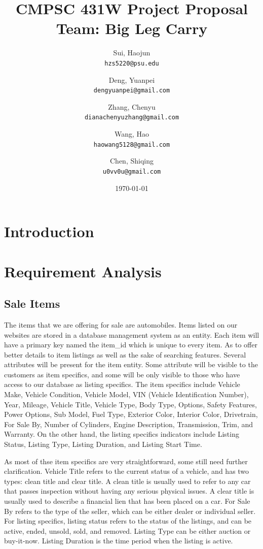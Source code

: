 \documentclass[12pt]{article}
\title{CMPSC 431W Project Proposal\\Team: Big Leg Carry}
\author{
	Sui, Haojun\\
	\texttt{hzs5220@psu.edu}
	\and
	Deng, Yuanpei\\
	\texttt{dengyuanpei@gmail.com}
	\and
	Zhang, Chenyu\\
	\texttt{dianachenyuzhang@gmail.com}
	\and
	Wang, Hao\\
	\texttt{haowang5128@gmail.com}
	\and
	Chen, Shiqing\\
	\texttt{u0vv0u@gmail.com}
}
\date{\today}
\begin{document}
\maketitle
\thispagestyle{empty}
\newpage
\tableofcontents
\setcounter{page}{1}
\newpage
\listoffigures
\newpage
\listoftables
\newpage


\section{Introduction}
\newpage

\section{Requirement Analysis}
\subsection{Sale Items}
The items that we are offering for sale are automobiles. Items listed on our websites are stored in a database management system as an entity. Each item will have a primary key named the item\_id which is unique to every item. As to offer better details to item listings as well as the sake of searching features. Several attributes will be present for the item entity. Some attribute will be visible to the customers as item specifics, and some will be only visible to those who have access to our database as listing specifics. The item specifics include Vehicle Make, Vehicle Condition, Vehicle Model, VIN (Vehicle Identification Number), Year, Mileage, Vehicle Title, Vehicle Type, Body Type, Options, Safety Features, Power Options, Sub Model, Fuel Type, Exterior Color, Interior Color, Drivetrain, For Sale By, Number of Cylinders, Engine Description, Transmission, Trim, and Warranty. On the other hand, the listing specifics indicators include Listing Status, Listing Type, Listing Duration, and Listing Start Time.\par
As most of thse item specifics are very straightforward, some still need further clarification. Vehicle Title refers to the current status of a vehicle, and has two types: clean title and clear title. A clean title is usually used to refer to any car that passes inspection without having any serious physical issues. A clear title is usually used to describe a financial lien that has been placed on a car. For Sale By refers to the type of the seller, which can be either dealer or individual seller. For listing specifics, listing status refers to the status of the listings, and can be active, ended, unsold, sold, and removed. Listing Type can be either auction or buy-it-now. Listing Duration is the time period when the listing is active.
\end{document}
